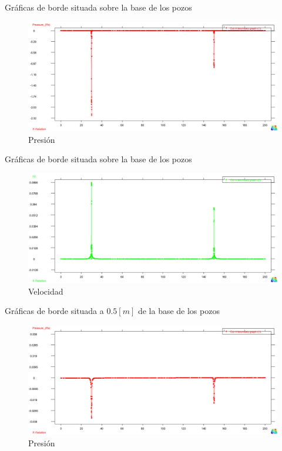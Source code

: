 \documentclass[spanish]{beamer}
\begin{document}
%
\begin{frame}{Gráficas de borde situada sobre la base de los pozos}
\begin{center}
\begin{figure}[htbp]
\centerline{\includegraphics[scale=0.25]{../img/200m/grf/200_grafico_presion_x_centro_pozos_distancia0}}
\caption{Presión}
\end{figure}
\end{center}
\end{frame}
%
%
\begin{frame}{Gráficas de borde situada sobre la base de los pozos}
\begin{center}
\begin{figure}[htbp]
\centerline{\includegraphics[scale=0.25]{../img/200m/grf/200_grafico_velocidad_x_centro_pozos_distancia0}}
\caption{Velocidad}
\end{figure}
\end{center}
\end{frame}
%
%
\begin{frame}{Gráficas de borde situada a $0.5[m]$ de la base de los pozos}
\begin{center}
\begin{figure}[htbp]
\centerline{\includegraphics[scale=0.25]{../img/200m/grf/200_grafico_presion_x_centro_pozos_distancia05}}
\caption{Presión}
\end{figure}
\end{center}
\end{frame}
\end{document}

